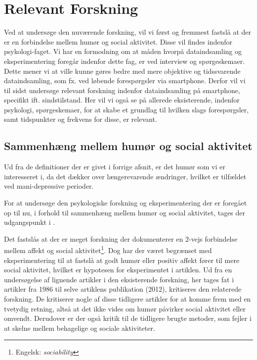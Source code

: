 

\section{Relevant Forskning}
Ved at undersøge den nuværende forskning, vil vi først og fremmest fastslå at der er en forbindelse mellem humør og social aktivitet.
Disse vil findes indenfor psykologi-faget.
Vi har en formodning om at måden hvorpå dataindsamling og eksperimentering foregår indenfor dette fag, er ved interview og spørgeskemaer.
Dette mener vi at ville kunne gøres bedre med mere objektive og tidssvarende dataindsamling, som fx. ved løbende forespørgsler via smartphone.
Derfor vil vi til sidst undersøge relevant forskning indenfor dataindsamling på smartphone, specifikt ift. sindstilstand.
Her vil vi også se på allerede eksisterende, indenfor psykologi, spørgeskemaer, for at skabe et grundlag til hvilken slags forespørgsler, samt tidspunkter og frekvens for disse, er relevant.

\subsection{Sammenhæng mellem humør og social aktivitet}
Ud fra de definitioner der er givet i forrige afsnit, er det humør som vi er interesseret i, da det dækker over længerevarende ændringer, hvilket er tilfældet ved mani-depressive perioder.

For at undersøge den psykologiske forskning og eksperimentering der er foregået op til nu, i forhold til sammenhæng mellem humør og social aktivitet, tages der udgangspunkt i \citet{whelan}.

Det fastslås at der er meget forskning der dokumenterer en 2-vejs forbindelse mellem affekt og social aktivitet\footnote{Engelsk: \textit{sociability}}.
Dog har der været begrænset med eksperimentering til at fastslå at godt humør eller positiv affekt fører til mere social aktivitet, hvilket er hypotesen for eksperimentet i artiklen.
Ud fra en undersøgelse af lignende artikler i den eksisterende forskning, her tages fat i artikler fra 1986 til selve artiklens publikation (2012), kritiseres den relaterede forskning.
De kritiserer nogle af disse tidligere artikler for at komme frem med en tvetydig retning, altså at det ikke vides om humør påvirker social aktivitet eller omvendt.
Derudover er der også kritik til de tidligere brugte metoder, som fejler i at skelne mellem behagelige og sociale aktiviteter.

